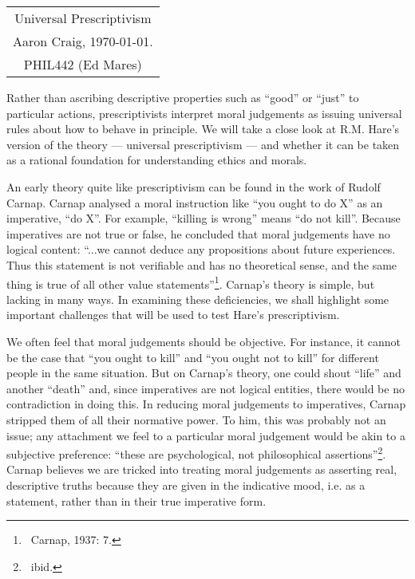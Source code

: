 \documentclass[12pt]{article}
\begin{document}
\begin{center}
\begin{tabular}{c}
\large Universal Prescriptivism \\
Aaron Craig, \today. \\
PHIL442 (Ed Mares) \\



\end{tabular}
\end{center}

\noindent
Rather than ascribing descriptive properties such as ``good'' or ``just'' to particular actions, prescriptivists interpret moral judgements as issuing universal rules about how to behave in principle. We will take a close look at R.M. Hare's version of the theory --- universal prescriptivism --- and whether it can be taken as a rational foundation for understanding ethics and morals. 

An early theory quite like prescriptivism can be found in the work of Rudolf Carnap. Carnap analysed a moral instruction like ``you ought to do X'' as an imperative, ``do X''. For example, ``killing is wrong'' means ``do not kill''. Because imperatives are not true or false, he concluded that moral judgements have no logical content: ``...we cannot deduce any propositions about future experiences. Thus this statement is not verifiable and has no theoretical sense, and the same thing is true of all other value statements''\footnote{~Carnap, 1937: 7.}. Carnap's theory is simple, but lacking in many ways. In examining these deficiencies, we shall highlight some important challenges that will be used to test Hare's prescriptivism.

We often feel that moral judgements should be objective. For instance, it cannot be the case that ``you ought to kill'' and ``you ought not to kill'' for different people in the same situation. But on Carnap's theory, one could shout ``life'' and another ``death'' and, since imperatives are not logical entities, there would be no contradiction in doing this. In reducing moral judgements to imperatives, Carnap stripped them of all their normative power. To him, this was probably not an issue; any attachment we feel to a particular moral judgement would be akin to a subjective preference: ``these are psychological, not philosophical assertions''\footnote{~ibid.}. Carnap believes we are tricked into treating moral judgements as asserting real, descriptive truths because they are given in the indicative mood, i.e. as a statement, rather than in their true imperative form.
\end{document}
